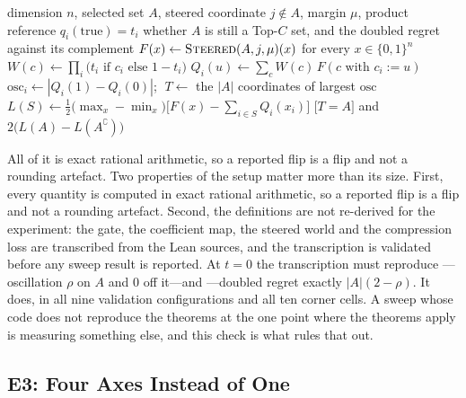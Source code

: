 \begin{algorithm}[htbp]
\caption{Evaluating the construction under one reference}
\label{alg:d6-sweep}
\begin{algorithmic}[1]
\REQUIRE dimension $n$, selected set $A$, steered coordinate $j\notin A$, margin $\mu$,
         product reference $q_{i}(\mathrm{true})=t_{i}$
\ENSURE whether $A$ is still a Top-$C$ set, and the doubled regret against its complement
\STATE $F(x)\leftarrow\textsc{Steered}(A,j,\mu)(x)$ for every $x\in\{0,1\}^{n}$
\STATE $W(c)\leftarrow\prod_{i}\bigl(t_{i}\text{ if }c_{i}\text{ else }1-t_{i}\bigr)$
  \STATE $Q_{i}(u)\leftarrow\sum_{c}W(c)\,F(c\text{ with }c_{i}:=u)$
\ENDFOR
\STATE $\mathrm{osc}_{i}\leftarrow|Q_{i}(1)-Q_{i}(0)|$;
       $\;T\leftarrow$ the $|A|$ coordinates of largest $\mathrm{osc}$
\STATE $L(S)\leftarrow\tfrac12\bigl(\max_{x}-\min_{x}\bigr)
       \bigl[F(x)-\sum_{i\in S}Q_{i}(x_{i})\bigr]$
\RETURN $\bigl[T=A\bigr]$ and $2\bigl(L(A)-L(A^{\complement})\bigr)$
\end{algorithmic}
\end{algorithm}

\noindent All of it is exact rational arithmetic, so a reported flip is a flip and not a
rounding artefact. Two properties of the setup matter more than its size. First, every quantity is computed in
exact rational arithmetic, so a reported flip is a flip and not a rounding artefact. Second,
the definitions are not re-derived for the experiment: the gate, the coefficient map, the
steered world and the compression loss are transcribed from the Lean sources, and the
transcription is validated before any sweep result is reported. At $t=0$ the transcription
must reproduce ---oscillation $\rho$ on $A$ and $0$ off it---and
---doubled regret exactly $|A|(2-\rho)$. It does, in all
nine validation configurations and all ten corner cells. A sweep whose code does not
reproduce the theorems at the one point where the theorems apply is measuring something else,
and this check is what rules that out.

\subsection{E3: Four Axes Instead of One}
\label{sec:d6-e3}

